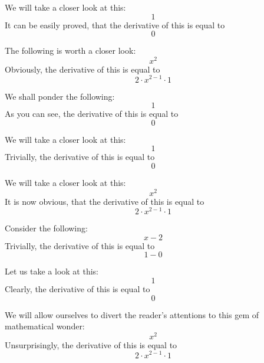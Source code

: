 \documentclass{article}
\begin{document}
We will take a closer look at this:
\begin{equation}
1 
\end{equation}
It can be easily proved, that the derivative of this is equal to
\begin{equation}
0 
\end{equation}

The following is worth a closer look:
\begin{equation}
x ^{2 } 
\end{equation}
Obviously, the derivative of this is equal to
\begin{equation}
2 \cdot x ^{2 - 1 } \cdot 1 
\end{equation}

We shall ponder the following:
\begin{equation}
1 
\end{equation}
As you can see, the derivative of this is equal to
\begin{equation}
0 
\end{equation}

We will take a closer look at this:
\begin{equation}
1 
\end{equation}
Trivially, the derivative of this is equal to
\begin{equation}
0 
\end{equation}

We will take a closer look at this:
\begin{equation}
x ^{2 } 
\end{equation}
It is now obvious, that the derivative of this is equal to
\begin{equation}
2 \cdot x ^{2 - 1 } \cdot 1 
\end{equation}

Consider the following:
\begin{equation}
x - 2 
\end{equation}
Trivially, the derivative of this is equal to
\begin{equation}
1 - 0 
\end{equation}

Let us take a look at this:
\begin{equation}
1 
\end{equation}
Clearly, the derivative of this is equal to
\begin{equation}
0 
\end{equation}

We will allow ourselves to divert the reader's attentions to this gem of mathematical wonder:
\begin{equation}
x ^{2 } 
\end{equation}
Unsurprisingly, the derivative of this is equal to
\begin{equation}
2 \cdot x ^{2 - 1 } \cdot 1 
\end{equation}
\end{document}
